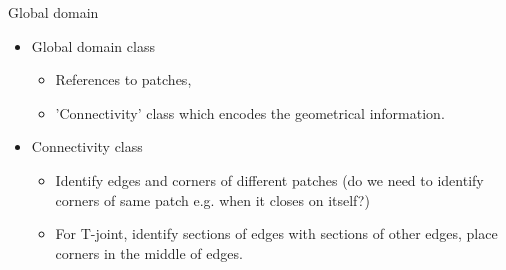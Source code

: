\documentclass[
	english,%
	logo=false,%
	eurofusion=false, %
	titlegraphic=true, %
	]{ippbeamer}
\begin{document}
\begin{frame}{Global domain}
	\begin{itemize}
		\item Global domain class
		\begin{itemize}
			\item References to patches,
			\item 'Connectivity' class which encodes the geometrical information.
		\end{itemize}
		\item Connectivity class
		\begin{itemize}
			\item Identify edges and corners of different patches (do we need to identify
					corners of same patch e.g. when it closes on itself?)
			\item For T-joint, identify sections of edges with sections of other edges, 
					place corners in the middle of edges.
		\end{itemize}
		
	\end{itemize}
	\end{frame}
\end{document}
